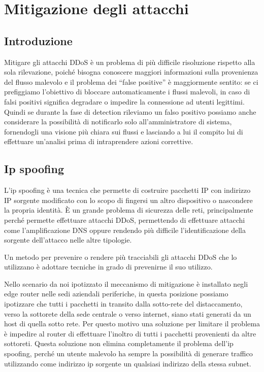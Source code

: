 \chapter{Mitigazione degli attacchi}


\section{Introduzione}

Mitigare gli attacchi DDoS è un problema di più difficile risoluzione rispetto alla sola rilevazione, poiché bisogna conoscere maggiori informazioni sulla provenienza del flusso malevolo e il problema dei ``false positive'' è maggiormente sentito: se ci prefiggiamo l'obiettivo di bloccare automaticamente i flussi malevoli, in caso di falsi positivi significa degradare o impedire la connessione ad utenti legittimi. Quindi se durante la fase di detection rileviamo un falso positivo possiamo anche considerare la possibilità di notificarlo solo all'amministratore di sistema, fornendogli una visione più chiara sui flussi e lasciando a lui il compito lui di effettuare un'analisi prima di intraprendere azioni correttive. 

\section{Ip spoofing}

L'ip spoofing è una tecnica che permette di costruire pacchetti IP con indirizzo IP sorgente modificato con lo scopo di fingersi un altro dispositivo o nascondere la propria identità. È un grande problema di sicurezza delle reti, principalmente perché permette effettuare attacchi DDoS, permettendo di effettuare attacchi come l'amplificazione DNS oppure rendendo più difficile l'identificazione della sorgente dell'attacco nelle altre tipologie.

Un metodo per prevenire o rendere più tracciabili gli attacchi DDoS che lo utilizzano è adottare tecniche in grado di prevenirne il suo utilizzo.

Nello scenario da noi ipotizzato il meccanismo di mitigazione è installato negli edge router nelle sedi aziendali periferiche, in questa posizione possiamo ipotizzare che tutti i pacchetti in transito dalla sotto-rete del distaccamento, verso la sottorete della sede centrale o verso internet, siano stati generati da un host di quella sotto rete. Per questo motivo una soluzione per limitare il problema è impedire al router di effettuare l'inoltro di tutti i pacchetti provenienti da altre sottoreti.
Questa soluzione non elimina completamente il problema dell'ip spoofing, perché un utente malevolo ha sempre la possibilità di generare traffico utilizzando come indirizzo ip sorgente un qualsiasi indirizzo della stessa subnet.


